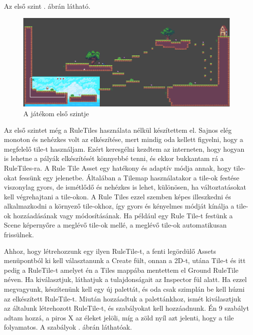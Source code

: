 Az első szint . ábrán látható.

\begin{figure}[ht]
\centering
\includegraphics[width=\linewidth]{images/firstlevel.png}
\caption{A játékom első szintje}
\label{fig:firstlevel}
\end{figure}

\newpage
{}

Az első szintet még a RuleTiles használata nélkül készítettem el. Sajnos elég monoton és nehézkes volt az elkészítése, mert mindig oda kellett figyelni, hogy a megfelelő tile-t használjam. Ezért keresgélni kezdtem az interneten, hogy hogyan is lehetne a pályák elkészítését könnyebbé tenni, és ekkor bukkantam rá a RuleTiles-ra. A Rule Tile Asset egy hatékony és adaptív módja annak, hogy tile-okat fessünk egy jelenetbe. Általában a Tilemap használatakor a tile-ok festése viszonylag gyors, de ismétlődő és nehézkes is lehet, különösen, ha változtatásokat kell végrehajtani a tile-okon. A Rule Tiles ezzel szemben képes illeszkedni és alkalmazkodni a környező tile-okhoz, így gyors és kényelmes módját kínálja a tile-ok hozzáadásának vagy módosításának. Ha például egy Rule Tile-t festünk a Scene képernyőre a meglévő tile-ok mellé, a meglévő tile-ok automatikusan frissülnek. \cite{unityruletile}

Ahhoz, hogy létrehozzunk egy ilyen RuleTile-t, a fenti legördülő Assets menüpontból ki kell választanunk a Create fült, onnan a 2D-t, utána Tile-t és itt pedig a RuleTile-t amelyet én a Tiles mappába mentettem el Ground RuleTile néven. Ha kiválasztjuk, láthatjuk a tulajdonságait az Inspector fül alatt. Ha ezzel megvagyunk, készítenünk kell egy új palettát, és oda csak szimplán be kell húzni az elkészített RuleTile-t. Miután hozzáadtuk a palettánkhoz, ismét kiválasztjuk az általunk létrehozott RuleTile-t, és szabályokat kell hozzáadnunk. \cite{unityruletile} Én 9 szabályt adtam hozzá, a piros X az éleket jelöli, míg a zöld nyíl azt jelenti, hogy a tile folyamatos. A szabályok . ábrán láthatóak.

